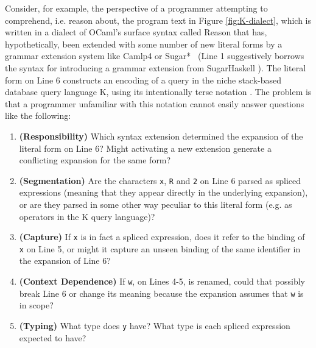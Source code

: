 \documentclass[acmsmall,review,anonymous]{acmart}\settopmatter{printfolios=true,printccs=false,printacmref=false}
\newcommand{\li}[1]{\lstinline[basicstyle=\ttfamily\fontsize{9pt}{1em}\selectfont]{#1}}
\begin{document}
Consider, for example, the perspective of a programmer attempting to comprehend, i.e. reason about, the program text in Figure \ref{fig:K-dialect}, which is written in a dialect of OCaml's surface syntax called Reason \cite{reason-what} that has, hypothetically, been extended with some number of new literal forms by a grammar extension system like Camlp4 \cite{ocaml-manual} or Sugar*~\cite{erdweg2011sugarj,erdweg2013framework} (Line 1 suggestively borrows the syntax for introducing a grammar extension from SugarHaskell \cite{erdweg2012layout}). 
The literal form on Line 6 constructs an encoding of a query in the niche stack-based database query language K, using its intentionally terse notation \cite{Whitney:2001:LOR:376284.375783}. The problem is that a programmer unfamiliar with this notation cannot easily answer questions like the following:

\begin{enumerate}[nolistsep,noitemsep,leftmargin=12px]
\item[\Circle] \textbf{(Responsibility)} Which syntax extension determined the expansion of the literal form on Line 6? Might activating a new extension generate a conflicting expansion for the same form?
\item[\Circle] \textbf{(Segmentation)} Are the characters \li{x}, \li{R} and \li{2} on Line 6 parsed as spliced expressions (meaning that they appear directly in the underlying expansion), or are they parsed in some other way peculiar to this literal form (e.g. as operators in the K query language)?
\item[\Circle] \textbf{(Capture)} If \li{x} is in fact a spliced expression, does it refer to the binding of \li{x} on Line 5, or might it capture an unseen binding of the same identifier in the expansion of Line 6?
\item[\Circle] \textbf{(Context Dependence)} If \li{w}, on Lines 4-5, is renamed, could that possibly break Line 6 or change its meaning because the expansion assumes that \li{w} is in scope?%
\item[\Circle] \textbf{(Typing)} What type does \li{y} have? What type is each spliced expression expected to have?
\end{enumerate}
\end{document}

